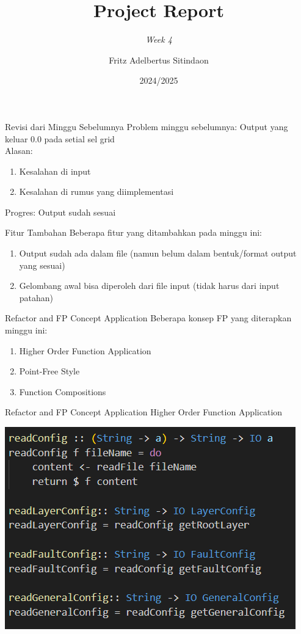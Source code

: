 \documentclass{beamer}
\title{Project Report}
\subtitle{\textit{Week 4}}
\date[]{2024/2025}
\author[Fritz]{Fritz Adelbertus Sitindaon}
\begin{document}
\begin{frame}
\titlepage
\end{frame}



\begin{frame}{Revisi dari Minggu Sebelumnya}
    Problem minggu sebelumnya: Output yang keluar 0.0 pada setial sel grid
    \\Alasan:
    \begin{enumerate}
        \item Kesalahan di input
        \item Kesalahan di rumus yang diimplementasi
    \end{enumerate}
    Progres: Output sudah sesuai
\end{frame}

\begin{frame}{Fitur Tambahan}
    Beberapa fitur yang ditambahkan pada minggu ini:
    \begin{enumerate}
        \item Output sudah ada dalam file (namun belum dalam bentuk/format output yang sesuai)
        \item Gelombang awal bisa diperoleh dari file input (tidak harus dari input patahan)
    \end{enumerate}
\end{frame}

\begin{frame}{Refactor and FP Concept Application}
    Beberapa konsep FP yang diterapkan minggu ini:
    \begin{enumerate}
        \item Higher Order Function Application
        \item Point-Free Style
        \item Function Compositions 
    \end{enumerate}
\end{frame}

\begin{frame}{Refactor and FP Concept Application}
    Higher Order Function Application
    \begin{center}
        \includegraphics[scale=0.7]{figure/composition.png}
    \end{center}
\end{frame}
\end{document}
